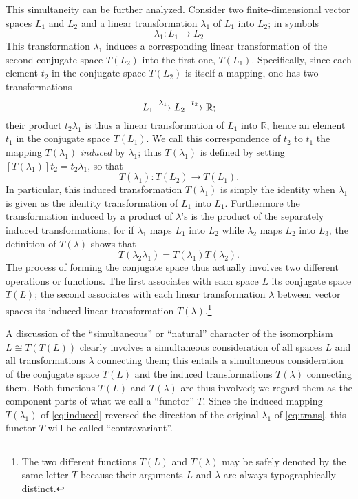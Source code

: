 \documentclass[11pt,a4paper]{report}
\newcommand{\R}{\mathbb{R}}
\begin{document}
This simultaneity can be further analyzed. Consider two finite\hyp{}dimensional
vector spaces $L_1$ and $L_2$ and a linear transformation $\lambda_1$ of
$L_1$ into $L_2$; in symbols
\begin{equation}\label{eq:trans}
	\lambda_1:L_1 \to L_2
\end{equation}
This transformation $\lambda_1$ induces a corresponding linear transformation
of the second conjugate space $T(L_2)$ into the first one, $T(L_1)$. 
Specifically, since each element $t_2$ in the conjugate space $T(L_2)$ is
itself a mapping, one has two transformations
\begin{equation*}
	L_1 \xlongrightarrow{\lambda_1} L_2 \xlongrightarrow{t_2} \R;
\end{equation*}
their product $t_2\lambda_1$ is thus a linear transformation of $L_1$ into
$\R$, hence an element $t_1$ in the conjugate space $T(L_1)$. We call this
correspondence of $t_2$ to $t_1$ the mapping $T(\lambda_1)$ \emph{induced}
by $\lambda_1$; thus $T(\lambda_1)$ is defined by setting 
$[T(\lambda_1)]t_2= t_2\lambda_1$, so that
\begin{equation}\label{eq:induced}
	T(\lambda_1): T(L_2)\to T(L_1).
\end{equation}
In particular, this induced transformation $T(\lambda_1)$ is simply the
identity when $\lambda_1$ is given as the identity transformation of
$L_1$ into $L_1$. Furthermore the transformation induced by a product
of $\lambda$'s is the product of the separately induced transformations,
for if $\lambda_1$ maps $L_1$ into $L_2$ while $\lambda_2$ maps $L_2$
into $L_3$, the definition of $T(\lambda)$ shows that
\begin{equation*}
	T(\lambda_2\lambda_1)=T(\lambda_1)T(\lambda_2).
\end{equation*} 
The process of forming the conjugate space thus actually
involves two different operations or functions. The first associates with
each space $L$ its conjugate space $T(L)$; the second associates with each
linear transformation $\lambda$ between vector spaces its induced linear
transformation $T(\lambda)$.\footnote{The two different functions $T(L)$
and $T(\lambda)$ may be safely denoted by the same letter $T$ because 
their arguments $L$ and $\lambda$ are always typographically distinct.}

A discussion of the ``simultaneous'' or ``natural'' character of the
isomorphism $L\cong T(T(L))$ clearly involves a simultaneous consideration
of all spaces $L$ and all transformations $\lambda$ connecting them; this
entails a simultaneous consideration of the conjugate space $T(L)$ and the
induced transformations $T(\lambda)$ connecting them. Both functions $T(L)$
and $T(\lambda)$ are thus involved; we regard them as the component parts
of what we call a ``functor'' $T$. Since the induced mapping $T(\lambda_1)$
of \cref{eq:induced} reversed the direction of the original $\lambda_1$ of \cref{eq:trans},
this functor $T$ will be called ``contravariant''.
\end{document}
